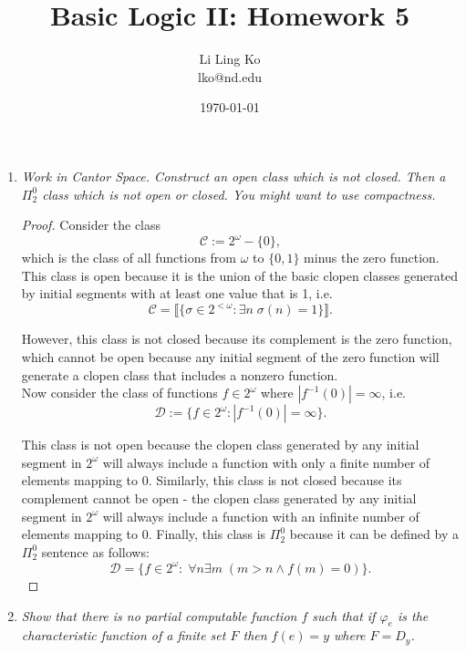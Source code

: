 \documentclass{article}
\begin{document}
\title{Basic Logic II: Homework 5}
\author{Li Ling Ko\\ lko@nd.edu}
\date{\today}
\maketitle

\begin{enumerate}[label={\bf Q\arabic*:}]
  \item \it Work in Cantor Space. Construct an open class which is not
    closed. Then a $\Pi_2^0$ class which is not open or closed. You might
    want to use compactness.

    \begin{proof}
      Consider the class
      \[\mathcal{C} :=2^\omega-\{0\},\]
      which is the class of all functions from $\omega$ to $\{0,1\}$ minus
      the zero function. This class is open because it is the union of the
      basic clopen classes generated by initial segments with at least one
      value that is 1, i.e.
      \[\mathcal{C} =\llbracket\{\sigma\in2^{<\omega}: \exists n\;
      \sigma(n)=1\}\rrbracket.\]

      However, this class is not closed because its complement is the zero
      function, which cannot be open because any initial segment of the
      zero function will generate a clopen class that includes a nonzero
      function. \\

      Now consider the class of functions $f\in2^\omega$ where
      $|f^{-1}(0)|=\infty$, i.e.
      \[\mathcal{D} :=\{f\in2^\omega: |f^{-1}(0)|=\infty\}.\]

      This class is not open because the clopen class generated by any
      initial segment in $2^\omega$ will always include a function with
      only a finite number of elements mapping to 0.  Similarly, this class
      is not closed because its complement cannot be open - the clopen
      class generated by any initial segment in $2^\omega$ will always
      include a function with an infinite number of elements mapping to 0.
      Finally, this class is $\Pi_2^0$ because it can be defined by a
      $\Pi_2^0$ sentence as follows:
      \[\mathcal{D} =\{f\in2^\omega:\; \forall n\exists m\; (m>n \wedge
      f(m)=0)\}.\]
    \end{proof}

  \item \it Show that there is no partial computable function $f$ such that
    if $\varphi_e$ is the characteristic function of a finite set $F$ then
    $f(e)=y$ where $F=D_y$.


\end{enumerate}
\end{document}
